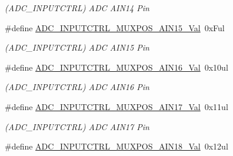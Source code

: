 \begin{DoxyCompactItemize}
\begin{DoxyCompactList}\small\item\em (A\+D\+C\+\_\+\+I\+N\+P\+U\+T\+C\+T\+R\+L) A\+D\+C A\+I\+N14 Pin \end{DoxyCompactList}\item 
\hypertarget{group___s_a_m_l21___a_d_c_ga59027c13e656f2325c09c8f21a6abfd7}{}\#define \hyperlink{group___s_a_m_l21___a_d_c_ga59027c13e656f2325c09c8f21a6abfd7}{A\+D\+C\+\_\+\+I\+N\+P\+U\+T\+C\+T\+R\+L\+\_\+\+M\+U\+X\+P\+O\+S\+\_\+\+A\+I\+N15\+\_\+\+Val}~0x\+Ful\label{group___s_a_m_l21___a_d_c_ga59027c13e656f2325c09c8f21a6abfd7}

\begin{DoxyCompactList}\small\item\em (A\+D\+C\+\_\+\+I\+N\+P\+U\+T\+C\+T\+R\+L) A\+D\+C A\+I\+N15 Pin \end{DoxyCompactList}\item 
\hypertarget{group___s_a_m_l21___a_d_c_ga34709dc7786fc55236c1b307ea2fe5fe}{}\#define \hyperlink{group___s_a_m_l21___a_d_c_ga34709dc7786fc55236c1b307ea2fe5fe}{A\+D\+C\+\_\+\+I\+N\+P\+U\+T\+C\+T\+R\+L\+\_\+\+M\+U\+X\+P\+O\+S\+\_\+\+A\+I\+N16\+\_\+\+Val}~0x10ul\label{group___s_a_m_l21___a_d_c_ga34709dc7786fc55236c1b307ea2fe5fe}

\begin{DoxyCompactList}\small\item\em (A\+D\+C\+\_\+\+I\+N\+P\+U\+T\+C\+T\+R\+L) A\+D\+C A\+I\+N16 Pin \end{DoxyCompactList}\item 
\hypertarget{group___s_a_m_l21___a_d_c_gab025b09d10197f292b71759e1921c271}{}\#define \hyperlink{group___s_a_m_l21___a_d_c_gab025b09d10197f292b71759e1921c271}{A\+D\+C\+\_\+\+I\+N\+P\+U\+T\+C\+T\+R\+L\+\_\+\+M\+U\+X\+P\+O\+S\+\_\+\+A\+I\+N17\+\_\+\+Val}~0x11ul\label{group___s_a_m_l21___a_d_c_gab025b09d10197f292b71759e1921c271}

\begin{DoxyCompactList}\small\item\em (A\+D\+C\+\_\+\+I\+N\+P\+U\+T\+C\+T\+R\+L) A\+D\+C A\+I\+N17 Pin \end{DoxyCompactList}\item 
\hypertarget{group___s_a_m_l21___a_d_c_ga72f8781f2eadc5d8d9f844bfae90b8b9}{}\#define \hyperlink{group___s_a_m_l21___a_d_c_ga72f8781f2eadc5d8d9f844bfae90b8b9}{A\+D\+C\+\_\+\+I\+N\+P\+U\+T\+C\+T\+R\+L\+\_\+\+M\+U\+X\+P\+O\+S\+\_\+\+A\+I\+N18\+\_\+\+Val}~0x12ul\label{group___s_a_m_l21___a_d_c_ga72f8781f2eadc5d8d9f844bfae90b8b9}


\end{DoxyCompactItemize}
